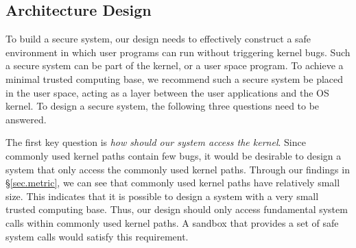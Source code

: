 \subsection{Architecture Design}
To build a secure system, our design needs to effectively construct a safe environment in which user programs 
can run without triggering kernel bugs. Such a secure system can be 
part of the kernel, or a user space program. To achieve a minimal 
trusted computing base, we recommend 
such a secure system be placed in the user space, acting as a layer between the user applications 
and the OS kernel. To design a secure system, the following three 
questions need to be answered. 

The first key question is \textit{how should our system access the kernel}. Since %
commonly used kernel paths contain few bugs, it would be desirable to design a system that only access the 
commonly used kernel paths. Through our findings in \S{\ref{sec.metric}}, we can see that commonly used kernel paths have relatively 
small size. This indicates that it is possible to design a system with a very small 
trusted computing base. Thus, our design should only access fundamental system 
calls within commonly used kernel paths. A sandbox that provides a 
set of safe system calls would satisfy this requirement.

